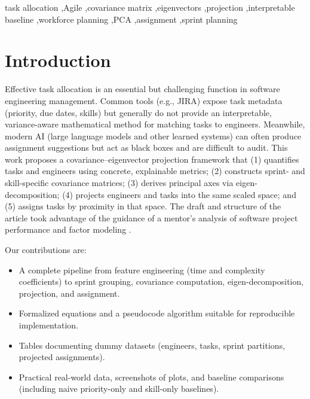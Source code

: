 \documentclass[final,1p,times]{elsarticle}
\begin{document}
\begin{frontmatter}
\begin{abstract}
\textbf{Conclusion:} The covariance–eigenvector projection framework offers a mathematically interpretable and efficient baseline for task allocation in Agile environments. It bridges the gap between human-readable heuristics and black-box AI methods, serving as a transparent foundation for future extensions involving multi-skill modeling and dynamic scheduling.

\end{abstract}

\begin{keyword}
task allocation \sep Agile \sep covariance matrix \sep eigenvectors \sep projection \sep interpretable baseline \sep workforce planning \sep PCA \sep assignment \sep sprint planning
\end{keyword}

\end{frontmatter}

\section{Introduction}\label{sec:intro}
Effective task allocation is an essential but challenging function in software engineering management. Common tools (e.g., JIRA) expose task metadata (priority, due dates, skills) but generally do not provide an interpretable, variance-aware mathematical method for matching tasks to engineers. Meanwhile, modern AI (large language models and other learned systems) can often produce assignment suggestions but act as black boxes and are difficult to audit. This work proposes a covariance--eigenvector projection framework that (1) quantifies tasks and engineers using concrete, explainable metrics; (2) constructs sprint- and skill-specific covariance matrices; (3) derives principal axes via eigen-decomposition; (4) projects engineers and tasks into the same scaled space; and (5) assigns tasks by proximity in that space. The draft and structure of the article took advantage of the guidance of a mentor's analysis of software project performance and factor modeling \cite{mentor_paper}.

Our contributions are:
\begin{itemize}[leftmargin=*]
    \item A complete pipeline from feature engineering (time and complexity coefficients) to sprint grouping, covariance computation, eigen-decomposition, projection, and assignment.
    \item Formalized equations and a pseudocode algorithm suitable for reproducible implementation.
    \item Tables documenting dummy datasets (engineers, tasks, sprint partitions, projected assignments).
    \item Practical real-world data, screenshots of plots, and baseline comparisons (including naive priority-only and skill-only baselines).
\end{itemize}
\end{document}
